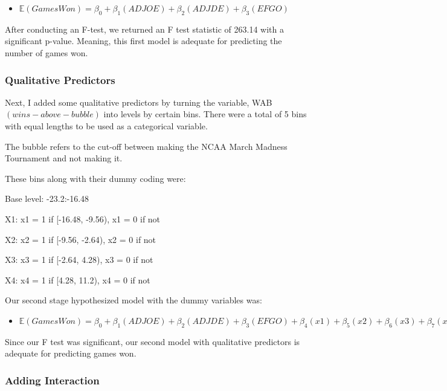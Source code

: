 \documentclass{article}
\begin{document}
\begin{itemize}

  \item $\mathbb{E}(Games Won) = \beta_{0} + \beta_{1}(ADJOE) + \beta_{2}(ADJDE) + \beta_{3}(EFGO)$ 
  
\end{itemize}


After conducting an F-test, we returned an F test statistic of 263.14 with a significant p-value. Meaning, this first model is adequate for predicting the number of games won. 

\subsubsection*{Qualitative Predictors}

Next, I added some qualitative predictors by turning the variable, WAB $(wins-above-bubble)$ into levels by certain bins. There were a total of 5 bins with equal lengths to be used as a categorical variable.

The bubble refers to the cut-off between making the NCAA March Madness Tournament and not making it. 

These bins along with their dummy coding were:

Base level: -23.2:-16.48

X1: x1 = 1 if [-16.48, -9.56), x1 = 0 if not

X2: x2 = 1 if [-9.56, -2.64), x2 = 0 if not

X3: x3 = 1 if [-2.64, 4.28), x3 = 0 if not

X4: x4 = 1 if [4.28, 11.2), x4 = 0 if not

Our second stage hypothesized model with the dummy variables was:

\begin{itemize}

  \item $\mathbb{E}(Games Won) = \beta_{0} + \beta_{1}(ADJOE) + \beta_{2}(ADJDE) + \beta_{3}(EFGO) + \beta_{4}(x1) + \beta_{5}(x2) + \beta_{6}(x3) + \beta_{7}(x4)$ 
  
\end{itemize}

Since our F test was significant, our second model with qualitative predictors is adequate for predicting games won. 

\subsubsection*{Adding Interaction}
\end{document}
